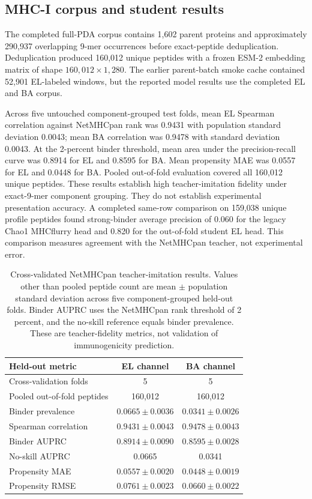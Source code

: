 \documentclass{article}
\begin{document}
\subsection{MHC-I corpus and student results}
The completed full-PDA corpus contains 1,602 parent proteins and approximately 290,937 overlapping 9-mer occurrences before exact-peptide deduplication. Deduplication produced 160,012 unique peptides with a frozen ESM-2 embedding matrix of shape $160{,}012\times1{,}280$. The earlier parent-batch smoke cache contained 52,901 EL-labeled windows, but the reported model results use the completed EL and BA corpus.

Across five untouched component-grouped test folds, mean EL Spearman correlation against NetMHCpan rank was 0.9431 with population standard deviation 0.0043; mean BA correlation was 0.9478 with standard deviation 0.0043. At the 2-percent binder threshold, mean area under the precision-recall curve was 0.8914 for EL and 0.8595 for BA. Mean propensity MAE was 0.0557 for EL and 0.0448 for BA. Pooled out-of-fold evaluation covered all 160,012 unique peptides. These results establish high teacher-imitation fidelity under exact-9-mer component grouping. They do not establish experimental presentation accuracy. A completed same-row comparison on 159,038 unique profile peptides found strong-binder average precision of 0.060 for the legacy Chao1 MHCflurry head and 0.820 for the out-of-fold student EL head. This comparison measures agreement with the NetMHCpan teacher, not experimental error.

\begin{table}[t]
\centering
\small
\begin{tabular}{lcc}
\hline
Held-out metric & EL channel & BA channel \\
\hline
Cross-validation folds & 5 & 5 \\
Pooled out-of-fold peptides & 160,012 & 160,012 \\
Binder prevalence & $0.0665 \pm 0.0036$ & $0.0341 \pm 0.0026$ \\
Spearman correlation & $0.9431 \pm 0.0043$ & $0.9478 \pm 0.0043$ \\
Binder AUPRC & $0.8914 \pm 0.0090$ & $0.8595 \pm 0.0028$ \\
No-skill AUPRC & 0.0665 & 0.0341 \\
Propensity MAE & $0.0557 \pm 0.0020$ & $0.0448 \pm 0.0019$ \\
Propensity RMSE & $0.0761 \pm 0.0023$ & $0.0660 \pm 0.0022$ \\
\hline
\end{tabular}
\caption{Cross-validated NetMHCpan teacher-imitation results. Values other than pooled peptide count are mean $\pm$ population standard deviation across five component-grouped held-out folds. Binder AUPRC uses the NetMHCpan rank threshold of 2 percent, and the no-skill reference equals binder prevalence. These are teacher-fidelity metrics, not validation of immunogenicity prediction.}
\label{tab:mhci-student-results}
\end{table}
\end{document}
